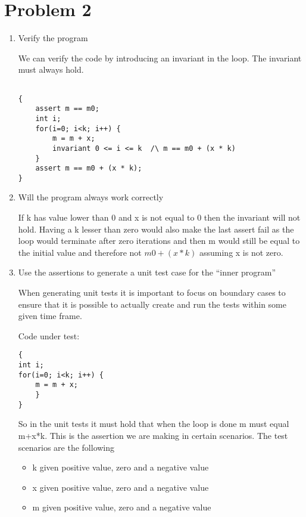 \chapter{Problem 2}
\label{chp:two}

\begin{enumerate}[label=(\alph*)]

\item  Verify the program

We can verify the code by introducing an invariant in the loop. The invariant must always hold.


\begin{lstlisting}

{
	assert m == m0;
	int i;
	for(i=0; i<k; i++) {
		m = m + x;
		invariant 0 <= i <= k  /\ m == m0 + (x * k)
	}
	assert m == m0 + (x * k);
}
\end{lstlisting}


\item Will the program always work correctly

If k has value lower than 0 and x is not equal to 0 then the invariant will not hold. Having a k lesser than zero would also make the last assert fail as the loop would terminate after zero iterations and then m would still be equal to the initial value and therefore not $m0 + (x*k)$ assuming x is not zero.


\item  Use the assertions to generate a unit test case for the “inner program”

When generating unit tests it is important to focus on boundary cases to ensure that it is possible to actually create and run the tests within some given time frame.

Code under test:
\begin{lstlisting}
{
int i;
for(i=0; i<k; i++) {
	m = m + x;
	}
}
\end{lstlisting}

So in the unit tests it must hold that when the loop is done m must equal m+x*k. This is the assertion we are making in certain scenarios. The test scenarios are the following
\begin{itemize}
	\item k given positive value, zero and a negative value
	\item x given positive value, zero and a negative value
	\item m given positive value, zero and a negative value
\end{itemize}


\end{enumerate}
